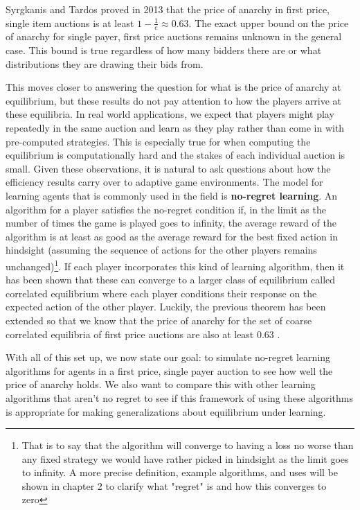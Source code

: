 \documentclass[12pt,twoside]{reedthesis}
\begin{document}
Syrgkanis and Tardos proved in 2013 that the price of anarchy in first price, single item auctions is at least $1 - \frac{1}{e} \approx 0.63$. The exact upper bound on the price of anarchy for single payer, first price auctions remains unknown in the general case. This bound is true regardless of how many bidders there are or what distributions they are drawing their bids from.

This moves closer to answering the question for what is the price of anarchy at equilibrium, but these results do not pay attention to how the players arrive at these equilibria. In real world applications, we expect that players might play repeatedly in the same auction and learn as they play rather than come in with pre-computed strategies. This is especially true for when computing the equilibrium is computationally hard and the stakes of each individual auction is small. Given these observations, it is natural to ask questions about how the efficiency results carry over to adaptive game environments. The model for learning agents that is commonly used in the field is \textbf{no-regret learning}. An algorithm for a player satisfies the no-regret condition if, in the limit as the number of times the game is played goes to infinity, the average reward of the algorithm is at least as good as the average reward for the best fixed action in hindsight (assuming the sequence of actions for the other players remains unchanged)\footnote{That is to say that the algorithm will converge to having a loss no worse than any fixed strategy we would have rather picked in hindsight as the limit goes to infinity. A more precise definition, example algorithms, and uses will be shown in chapter 2 to clarify what "regret" is and how this converges to zero}. If each player  incorporates this kind of learning algorithm, then it has been shown that these can converge to a larger class of equilibrium called correlated equilibrium where each player conditions their response on the expected action of the other player. Luckily, the previous theorem has been extended so that we know that the price of anarchy for the set of coarse correlated equilibria of first price auctions are also at least 0.63 \citep{Roughgarden2017}. %

With all of this set up, we now state our goal: to simulate no-regret learning algorithms for agents in a first price, single payer auction to see how well the price of anarchy holds. We also want to compare this with other learning algorithms that aren't no regret to see if this framework of using these algorithms is appropriate for making generalizations about equilibrium under learning.
\end{document}
